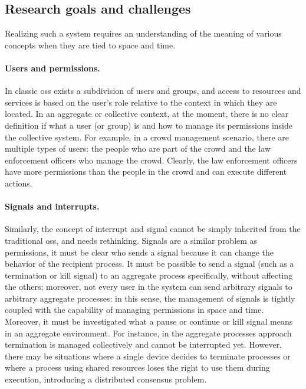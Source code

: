 \documentclass[12pt, a4paper]{article}
\begin{document}
\subsection{Research goals and challenges}
\label{subsec:research-goals-and-challenges}

Realizing such a system requires an understanding of the meaning of various concepts when they are tied to space and time.

\paragraph{Users and permissions.}
\label{par:users-and-permissions}
In classic \acp{os} exists a subdivision of users and groups,
and access to resources and services is based on the user's role relative to the context in which they are located.
%
In an aggregate or collective context,
at the moment,
there is no clear definition if what a user (or group) is and how to manage its permissions inside the collective system.
%
For example,
in a crowd management scenario,
there are multiple types of users:
the people who are part of the crowd and the law enforcement officers who manage the crowd.
%
Clearly,
the law enforcement officers have more permissions than the people in the crowd and can execute different actions.

\paragraph{Signals and interrupts.}
\label{par:signals-and-interrupts}
Similarly, the concept of interrupt and signal cannot be simply inherited from the traditional \acp{os},
and needs rethinking.
%
Signals are a similar problem as permissions, it must be clear who sends a signal because it can
change the behavior of the recipient process.
%
It must be possible to send a signal (such as a termination or kill signal) to an aggregate process specifically,
without affecting the others;
moreover,
not every user in the system can send arbitrary signals to arbitrary aggregate processes:
in this sense,
the management of signals is tightly coupled with the capability of managing permissions in space and time.
%
Moreover,
it must be investigated what a pause or continue or kill signal means in an aggregate environment.
%
For instance,
in the aggregate processes approach termination is managed collectively and cannot be interrupted yet. %
%
However,
there may be situations where a single device decides to terminate processes or where a process using shared
resources loses the right to use them during execution,
introducing a distributed consensus problem.
\end{document}
